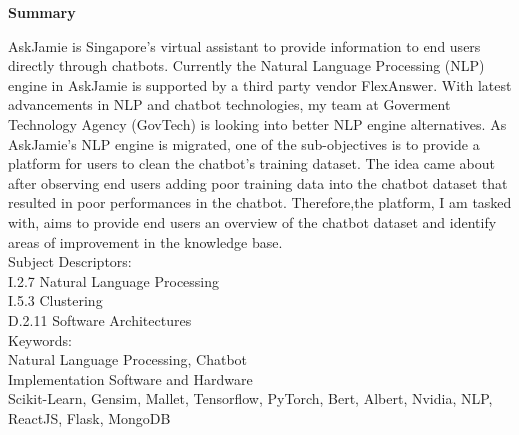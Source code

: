 \begin{center}
	\Large\textbf{Summary}
\end{center}
\noindent
AskJamie is Singapore's virtual assistant to provide information to end users directly through chatbots. Currently the Natural Language Processing (NLP) engine in AskJamie is supported by a third party vendor FlexAnswer. With latest advancements in NLP and chatbot technologies, my team at Goverment Technology Agency (GovTech) is looking into better NLP engine alternatives. As AskJamie's NLP engine is migrated, one of the sub-objectives is to provide a platform for users to clean the chatbot's training dataset. The idea came about after observing end users adding poor training data into the chatbot dataset that resulted in poor performances in the chatbot. Therefore,the platform, I am tasked with, aims to provide end users an overview of the chatbot dataset and identify areas of improvement in the knowledge base.\\

\noindent
Subject Descriptors:\\
\indent I.2.7 Natural Language Processing\\
\indent I.5.3 Clustering\\
\indent D.2.11 Software Architectures\\

\noindent
Keywords:\\
\indent Natural Language Processing, Chatbot\\

\noindent
Implementation Software and Hardware\\
\indent Scikit-Learn, Gensim, Mallet, Tensorflow, PyTorch, Bert, Albert, Nvidia, NLP, ReactJS, Flask, MongoDB\\